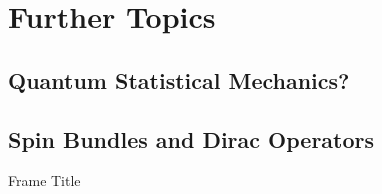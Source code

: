 \section{Further Topics}

\subsection{Quantum Statistical Mechanics?}

\subsection{Spin Bundles and Dirac Operators}

\begin{frame}{Frame Title} %

\end{frame}
